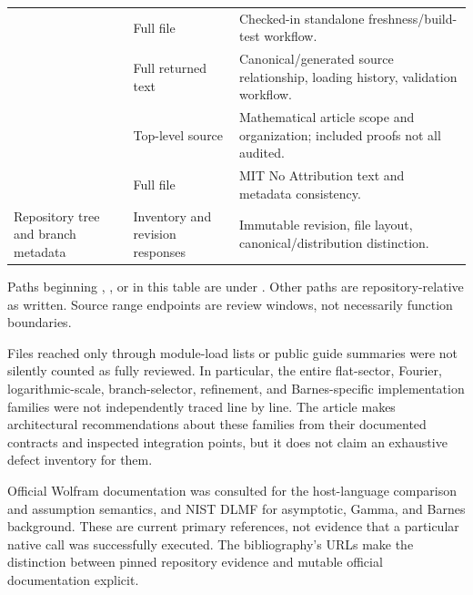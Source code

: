 \documentclass[11pt,a4paper]{article}
\theoremstyle{remark}\newtheorem{remark}[proposition]{Remark}
\begin{document}
\begin{longtable}{P{0.43\textwidth}P{0.2\textwidth}P{0.27\textwidth}}
 & Full file & Checked-in standalone freshness/build-test workflow. \\
 & Full returned text & Canonical/generated source relationship, loading history, validation workflow. \\
 & Top-level source & Mathematical article scope and organization; included proofs not all audited. \\
 & Full file & MIT No Attribution text and metadata consistency. \\
Repository tree and branch metadata & Inventory and revision responses & Immutable revision, file layout, canonical/distribution distinction. \\
\bottomrule
\end{longtable}
Paths beginning , , or  in this table are under . Other paths are repository-relative as written. Source range endpoints are review windows, not necessarily function boundaries.

Files reached only through module-load lists or public guide summaries were not silently counted as fully reviewed. In particular, the entire flat-sector, Fourier, logarithmic-scale, branch-selector, refinement, and Barnes-specific implementation families were not independently traced line by line. The article makes architectural recommendations about these families from their documented contracts and inspected integration points, but it does not claim an exhaustive defect inventory for them.

Official Wolfram documentation was consulted for the host-language comparison and assumption semantics, and NIST DLMF for asymptotic, Gamma, and Barnes background. These are current primary references, not evidence that a particular native call was successfully executed. The bibliography's URLs make the distinction between pinned repository evidence and mutable official documentation explicit.



\clearpage

\end{document}
